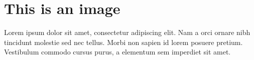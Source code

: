 \chapter{This is an image}
\label{app:appendix1}

Lorem ipsum dolor sit amet, consectetur adipiscing elit. Nam a orci ornare nibh tincidunt molestie sed nec tellus. Morbi non sapien id lorem posuere pretium. Vestibulum commodo cursus purus, a elementum sem imperdiet sit amet.

\begin{center}
\end{center}

